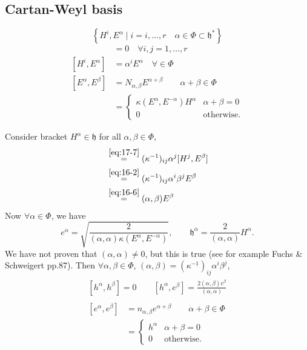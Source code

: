 \subsection*{Cartan-Weyl basis}%

\begin{equation}
  \left\{ H^{i}, E^{\alpha} \mid i = i, \dots, r \quad \alpha \in \Phi \subset \mathfrak{h}^* \right\}
\end{equation}
\begin{align}
  [H^{i}, H^{j}] &= 0 \quad \forall i, {j} = 1, \dots, r \\
  [H^{i}, E^{\alpha}] &= \alpha^{i} E^{\alpha} \quad \forall \in \Phi \\
  [E^{\alpha}, E^{\beta}] &= N_{\alpha, \beta} E^{\alpha + \beta} \qquad \alpha + \beta \in \Phi \\
  &= 
  \begin{cases}
    \kappa(E^{\alpha}, E^{-\alpha}) H^{\alpha} & \alpha + \beta = 0 \\
    0 & \text{otherwise}.
  \end{cases}
\end{align}

Consider bracket  $H^{\alpha} \in \mathfrak{h}$ for all $\alpha, \beta \in \Phi$,
 \begin{align}
   [H^{\alpha}, E^{\beta}] &\stackrel{\eqref{eq:17-7}}{=} (\kappa^{-1})_{ij} \alpha^{j} [H^{j}, E^{\beta}] \\
			   &\stackrel{\eqref{eq:16-2}}{=} (\kappa^{-1})_{ij} \alpha^{i} \beta^{j} E^{\beta} \\
			   &\stackrel{\eqref{eq:16-6}}= (\alpha, \beta) E^{\beta}
\end{align}
Now $\forall \alpha \in \Phi$, we have
\begin{equation}
  e^{\alpha} = \sqrt{\frac{2}{(\alpha, \alpha)\kappa(E^{\alpha}, E^{-\alpha})}}, \qquad \mathfrak{h}^{\alpha} = \frac{2}{(\alpha, \alpha)} H^{\alpha}.
\end{equation}
We have not proven that $(\alpha, \alpha) \neq 0$, but this is true (see for example Fuchs \& Schweigert pp.87).
Then $\forall \alpha, \beta \in \Phi$, $(\alpha, \beta) = (\kappa^{-1})_{ij} \alpha^{i} \beta^{j}$, 
 \begin{align}
   \begin{split}
   [h^{\alpha}, h^{\beta}] = 0 \qquad [h^{\alpha}, e^{\beta}] = \frac{2 (\alpha, \beta) e^{\beta}}{(\alpha, \alpha)}
   \end{split} \\
   \begin{split}
     \label{eq:17-10}
     [e^{\alpha}, e^{\beta}] &= n_{\alpha, \beta} e^{\alpha + \beta} \qquad \alpha + \beta \in \Phi \\
     &=
     \begin{cases}
       h^{\alpha} & \alpha + \beta = 0 \\
       0 & \text{otherwise}.
     \end{cases}
   \end{split}
\end{align}


